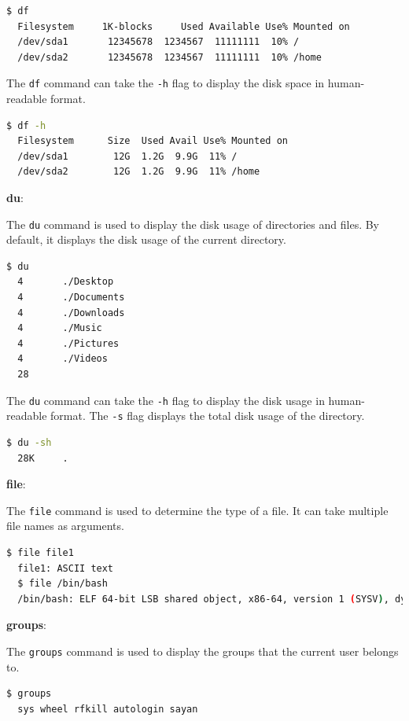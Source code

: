 \begin{lstlisting}[language=bash]
  $ df
  Filesystem     1K-blocks     Used Available Use% Mounted on
  /dev/sda1       12345678  1234567  11111111  10% /
  /dev/sda2       12345678  1234567  11111111  10% /home
\end{lstlisting}

The \texttt{df} command can take the \texttt{-h} flag to display the disk space in human-readable format.

\begin{lstlisting}[language=bash]
  $ df -h
  Filesystem      Size  Used Avail Use% Mounted on
  /dev/sda1        12G  1.2G  9.9G  11% /
  /dev/sda2        12G  1.2G  9.9G  11% /home
\end{lstlisting}

\textbf{du}:

The \texttt{du} command is used to display the disk usage of directories and files.
By default, it displays the disk usage of the current directory.

\begin{lstlisting}[language=bash]
  $ du
  4       ./Desktop
  4       ./Documents
  4       ./Downloads
  4       ./Music
  4       ./Pictures
  4       ./Videos
  28
\end{lstlisting}

The \texttt{du} command can take the \texttt{-h} flag to display the disk usage in human-readable format.
The \texttt{-s} flag displays the total disk usage of the directory.

\begin{lstlisting}[language=bash]
  $ du -sh
  28K     .
\end{lstlisting}

\textbf{file}:

The \texttt{file} command is used to determine the type of a file.
It can take multiple file names as arguments.

\begin{lstlisting}[language=bash]
  $ file file1
  file1: ASCII text
  $ file /bin/bash
  /bin/bash: ELF 64-bit LSB shared object, x86-64, version 1 (SYSV), dynamically linked, interpreter /lib64/ld-linux-x86-64.so.2, for GNU/Linux 3.2.0, BuildID[sha1]=1234567890abcdef, stripped
\end{lstlisting}

\textbf{groups}:

The \texttt{groups} command is used to display the groups that the current user belongs to.

\begin{lstlisting}[language=bash]
  $ groups
  sys wheel rfkill autologin sayan
\end{lstlisting}


